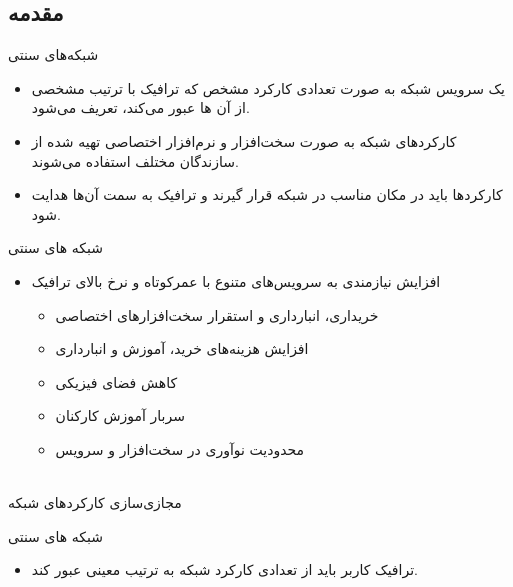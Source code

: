 \documentclass{beamer}
\makeatletter
\newcommand{\RTList}{\raggedleft\rightskip\@totalleftmargin}
\makeatother
\begin{document}
\begin{persian}
\begin{frame}{}
    \section{مقدمه}
\end{frame}
\begin{frame}{شبکه‌های سنتی}
    \begin{itemize}\RTList{}
        \justifying
        \item یک سرویس شبکه به صورت تعدادی کارکرد مشخص که ترافیک با ترتیب مشخصی از آن ها عبور می‌کند، تعریف می‌شود.
        \item کارکردهای شبکه به صورت سخت‌افزار و نرم‌افزار اختصاصی تهیه شده از سازندگان مختلف استفاده می‌شوند.
        \item کارکردها باید در مکان مناسب در شبکه قرار گیرند و ترافیک به سمت آن‌ها هدایت شود.
    \end{itemize}
\end{frame}
\begin{frame}{شبکه های سنتی}
    \begin{itemize}\RTList{}
        \justifying
        \item افزایش نیازمندی به سرویس‌های متنوع با عمرکوتاه و نرخ بالای ترافیک
        \begin{itemize}\RTList{}
            \item خریداری، انبارداری و استقرار سخت‌افزارهای اختصاصی
            \item افزایش هزینه‌های خرید، آموزش و انبارداری
            \item کاهش فضای فیزیکی
            \item سربار آموزش کارکنان
            \item محدودیت نوآوری در سخت‌افزار و سرویس
        \end{itemize}
    \end{itemize}
    \begin{block}{}
        \centering
        \\
        مجازی‌سازی کارکردهای شبکه
    \end{block}
\end{frame}
\begin{frame}{شبکه های سنتی}
    \begin{itemize}\RTList{}
        \justifying
        \item ترافیک کاربر باید از تعدادی کارکرد شبکه به ترتیب معینی عبور کند.

\end{itemize}
\end{frame}
\end{persian}
\end{document}

